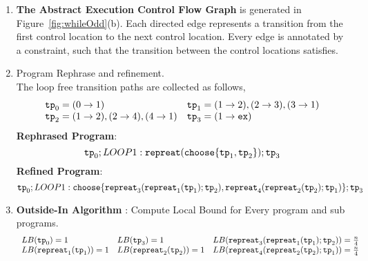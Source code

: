     \begin{enumerate}
      \item  \textbf{The Abstract Execution Control Flow Graph} is generated in Figure~\ref{fig:whileOdd}(b).
      Each directed edge represents a transition from the first control location to the next control location.
      Every edge is annotated by a constraint, such that the transition between the control locations satisfies.
    
    \item Program Rephrase and refinement. 
    \\
    The loop free transition paths are collected as follows,
    \[
      \begin{array}{ll}
        \mathtt{tp}_0 = (0 \to 1)
        &
        \mathtt{tp}_1 = (1 \to 2), (2 \to 3), (3 \to 1)
        \\
        \mathtt{tp}_2 = (1 \to 2), (2 \to 4), (4 \to 1)
        &
        \mathtt{tp}_3 = (1 \to \mathtt{ex})
      \end{array}
      \]
    \textbf{Rephrased Program}:
    \[
    \mathtt{tp}_0 ; LOOP1: \mathtt{repreat}(\mathtt{choose}\{\mathtt{tp}_1, \mathtt{tp}_2 \}); \mathtt{tp}_3
    \]
    \textbf{Refined Program}:
    \[
      \mathtt{tp}_0 ; LOOP1: \mathtt{choose}\{\mathtt{repreat}_3(\mathtt{repreat}_1(\mathtt{tp}_1); \mathtt{tp}_2) , \mathtt{repreat}_4(\mathtt{repreat}_2(\mathtt{tp}_2); \mathtt{tp}_1) \}; \mathtt{tp}_3
      \]
    \item \textbf{Outside-In Algorithm} : Compute Local Bound for Every program and sub programs.
    \[
      \begin{array}{lll}
        LB(\mathtt{tp}_0) = 1
        &
        LB(\mathtt{tp}_3) = 1
        &
        LB(\mathtt{repreat}_3(\mathtt{repreat}_1(\mathtt{tp}_1); \mathtt{tp}_2)) = \frac{n}{4} 
        \\
        LB(\mathtt{repreat}_1(\mathtt{tp}_1)) = 1 
        &
        LB(\mathtt{repreat}_2(\mathtt{tp}_2)) = 1 
        &
        LB(\mathtt{repreat}_4(\mathtt{repreat}_2(\mathtt{tp}_2); \mathtt{tp}_1)) = \frac{n}{4}
      \end{array}
      \]

\end{enumerate}
